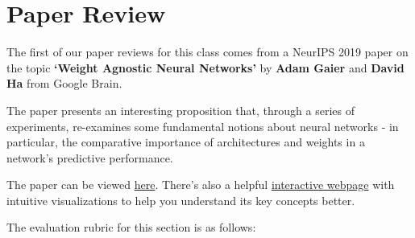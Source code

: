 \documentclass[11pt,english]{article}
\begin{document}
\newpage

\section{Paper Review}

The first of our paper reviews for this class comes from a NeurIPS 2019 paper on the topic \textbf{`Weight Agnostic Neural Networks'} by \textbf{Adam Gaier} and \textbf{David Ha} from Google Brain.

The paper presents an interesting proposition that, through a series of experiments, re-examines some fundamental notions about neural networks - in particular, the comparative importance of architectures and weights in a network's predictive performance. 

The paper can be viewed \href{https://arxiv.org/abs/1906.04358}{here}.
There's also a helpful \href{https://weightagnostic.github.io/}{interactive webpage} with intuitive visualizations to help you understand its key concepts better. 

The evaluation rubric for this section is as follows:
\end{document}
